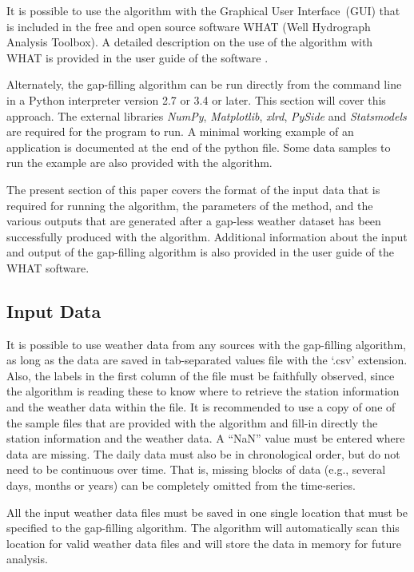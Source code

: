 \documentclass[TechnicalNoteMeteo.tex]{subfiles}
\begin{document}
It is possible to use the algorithm with the Graphical User Interface~(GUI) that is included in the free and open source software WHAT (Well Hydrograph Analysis Toolbox). A detailed description on the use of the algorithm with WHAT is provided in the user guide of the software \citep{gosselin_what_2015}.

Alternately, the gap-filling algorithm can be run directly from the command line in a Python interpreter version 2.7 or 3.4 or later. This section will cover this approach. The external libraries \emph{NumPy}, \emph{Matplotlib}, \emph{xlrd}, \emph{PySide} and \emph{Statsmodels} are required for the program to run. A minimal working example of an application is documented at the end of the python file. Some data samples to run the example are also provided with the algorithm.

The present section of this paper covers the format of the input data that is required for running the algorithm, the parameters of the method, and the various outputs that are generated after a gap-less weather dataset has been successfully produced with the algorithm. Additional information about the input and output of the gap-filling algorithm is also provided in the user guide of the WHAT software.

\subsection{Input Data}\label{subsec:input}

It is possible to use weather data from any sources with the gap-filling algorithm, as long as the data are saved in tab-separated values file with the `.csv' extension. Also, the labels in the first column of the file must be faithfully observed, since the algorithm is reading these to know where to retrieve the station information and the weather data within the file. It is recommended to use a copy of one of the sample files that are provided with the algorithm and fill-in directly the station information and the weather data. A ``NaN'' value must be entered where data are missing. The daily data must also be in chronological order, but do not need to be continuous over time. That is, missing blocks of data (e.g., several days, months or years) can be completely omitted from the time-series. 

All the input weather data files must be saved in one single location that must be specified to the gap-filling algorithm. The algorithm will automatically scan this location for valid weather data files and will store the data in memory for future analysis.
\end{document}
